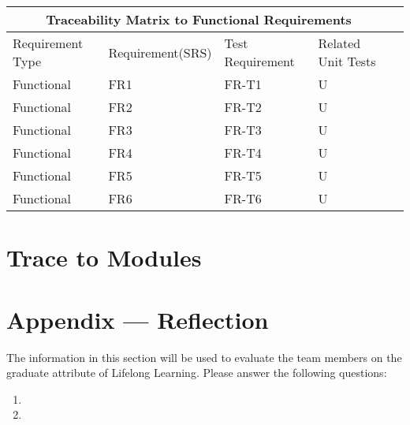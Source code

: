\documentclass[12pt, titlepage]{article}
\begin{document}
 \begin{tabular}{ |p{3cm}||p{4cm}|p{4cm}|p{4cm}|p{4cm}| }
  \hline
  \multicolumn{4}{|c|}{Traceability Matrix to Functional Requirements} \\
  \hline
  Requirement Type & Requirement(SRS) & Test Requirement & Related Unit Tests \\
  \hline
  Functional   & FR1  & FR-T1 & U \\ \hline
  Functional   & FR2  & FR-T2 & U \\ \hline
  Functional   & FR3  & FR-T3 & U \\ \hline
  Functional   & FR4  & FR-T4 & U \\ \hline
  Functional   & FR5  & FR-T5 & U \\ \hline
  Functional   & FR6  & FR-T6 & U \\ \hline
  
 \end{tabular}
		
\section{Trace to Modules}		




\newpage{}
\section*{Appendix --- Reflection}

The information in this section will be used to evaluate the team members on the
graduate attribute of Lifelong Learning.  Please answer the following questions:

\begin{enumerate}
  \item 
  \item 
\end{enumerate}
\end{document}
